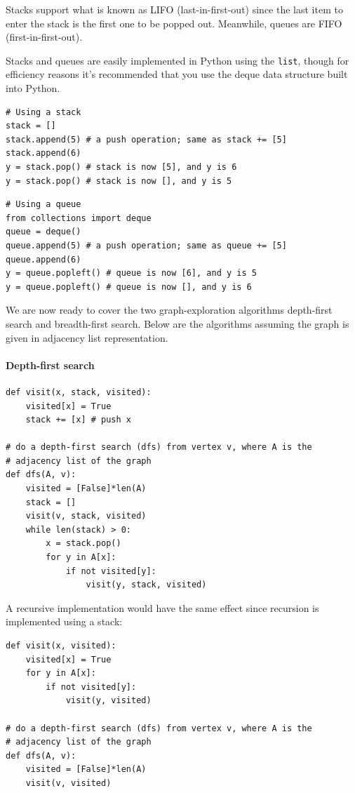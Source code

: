 \documentclass[11pt]{article}
\begin{document}
Stacks support what is known as LIFO (last-in-first-out) since the
last item to enter the stack is the first one to be popped out.
Meanwhile, queues are FIFO (first-in-first-out).

Stacks and queues are easily implemented in Python using the
\texttt{list}, though for efficiency reasons it's recommended that you
use the deque data structure built into Python.

\begin{verbatim}
# Using a stack
stack = []
stack.append(5) # a push operation; same as stack += [5]
stack.append(6)
y = stack.pop() # stack is now [5], and y is 6
y = stack.pop() # stack is now [], and y is 5
\end{verbatim}

\begin{verbatim}
# Using a queue
from collections import deque
queue = deque()
queue.append(5) # a push operation; same as queue += [5]
queue.append(6)
y = queue.popleft() # queue is now [6], and y is 5
y = queue.popleft() # queue is now [], and y is 6
\end{verbatim}

We are now ready to cover the two graph-exploration algorithms
depth-first search and breadth-first search.  Below are the
algorithms assuming the graph is given in adjacency list
representation.  

\paragraph{Depth-first search}

\begin{verbatim}
def visit(x, stack, visited):
    visited[x] = True
    stack += [x] # push x

# do a depth-first search (dfs) from vertex v, where A is the
# adjacency list of the graph
def dfs(A, v):
    visited = [False]*len(A)
    stack = []
    visit(v, stack, visited)
    while len(stack) > 0:
        x = stack.pop()
        for y in A[x]:
            if not visited[y]:
                visit(y, stack, visited)
\end{verbatim}

A recursive implementation would have the same effect since recursion
is implemented using a stack:

\begin{verbatim}
def visit(x, visited):
    visited[x] = True
    for y in A[x]:
        if not visited[y]:
            visit(y, visited)

# do a depth-first search (dfs) from vertex v, where A is the
# adjacency list of the graph
def dfs(A, v):
    visited = [False]*len(A)
    visit(v, visited)
\end{verbatim}
\end{document}
